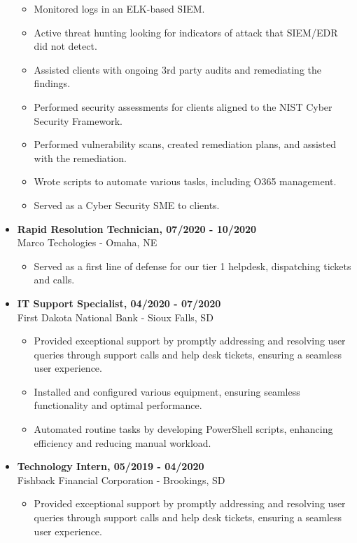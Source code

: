 \documentclass[a4paper,10pt]{article}
\begin{document}
\begin{itemize}
\begin{itemize}
        \item Monitored logs in an ELK-based SIEM.
        \item Active threat hunting looking for indicators of attack that SIEM/EDR did not detect.
        \item Assisted clients with ongoing 3rd party audits and remediating the findings.
        \item Performed security assessments for clients aligned to the NIST Cyber Security Framework.
        \item Performed vulnerability scans, created remediation plans, and assisted with the remediation.
        \item Wrote scripts to automate various tasks, including O365 management.
        \item Served as a Cyber Security SME to clients.
    \end{itemize}
    \item\textbf{Rapid Resolution Technician, 07/2020 - 10/2020} \\
    Marco Techologies - Omaha, NE
    \begin{itemize}
        \small
        \leftskip=4em
        \item Served as a first line of defense for our tier 1 helpdesk, dispatching tickets and calls.
    \end{itemize}
    \item\textbf{IT Support Specialist, 04/2020 - 07/2020} \\
    First Dakota National Bank - Sioux Falls, SD
    \begin{itemize}
        \small
        \leftskip=4em
        \item Provided exceptional support by promptly addressing and resolving user queries through support calls and help desk tickets, ensuring a seamless user experience.
        \item Installed and configured various equipment, ensuring seamless functionality and optimal performance.
        \item Automated routine tasks by developing PowerShell scripts, enhancing efficiency and reducing manual workload.
    \end{itemize}
    \item\textbf{Technology Intern, 05/2019 - 04/2020} \\
    Fishback Financial Corporation - Brookings, SD 
    \begin{itemize}
        \small
        \leftskip=4em
        \item Provided exceptional support by promptly addressing and resolving user queries through support calls and help desk tickets, ensuring a seamless user experience.

\end{itemize}
\end{itemize}
\end{document}
